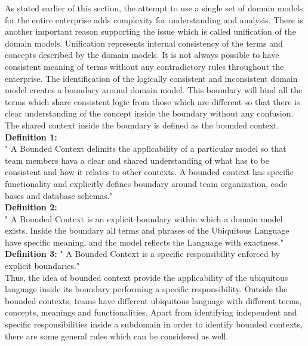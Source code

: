 As stated earlier of this section, the attempt to use a single set of domain models for the entire enterprise adds complexity for understanding and analysis. There is another important reason supporting the issue which is called unification of the domain models. Unification represents internal consistency of the terms and concepts described by the domain models. It is not always possible to have consistent meaning of terms without any contradictory rules throughout the enterprise. The identification of the logically consistent and inconsistent domain model creates a boundary around domain model. This boundary will bind all the terms which share consistent logic from those which are different so that there is clear understanding of the concept inside the boundary without any confusion. The shared context inside the boundary is defined as the bounded context.
\\
\textbf{Definition 1:} \label{bounded_context_definition_1}
\\
" A Bounded Context delimits the applicability of a particular model so that team members hava a clear and shared understanding of what has to be consistent and how it relates to other contexts. A bounded context has specific functionality and explicitly defines boundary around team organization, code bases and database schemas."\cite{Evans:2003aa}
\\
\textbf{Definition 2:} \label{bounded_context_definition_2}
\\
" A Bounded Context is an explicit boundary within which a domain model exists. Inside the boundary all terms and phrases of the Ubiquitous Language have specific meaning, and the model reflects the Language with exactness." \cite{Vernon:2013aa}
\\
\textbf{Definition 3:} \label{bounded_context_definition_3}
" A Bounded Context is a specific responsibility enforced by explicit boundaries." \cite{Mike:2012aa}
\\
Thus, the idea of bounded context provide the applicability of the ubiquitous language inside its boundary performing a specific responsibility. Outside the bounded contexts, teams have different ubiquitous language with different terms, concepts, meanings and functionalities. Apart from identifying independent and specific responsibilities inside a subdomain in order to identify bounded contexts, there are some general rules which can be considered as well.
